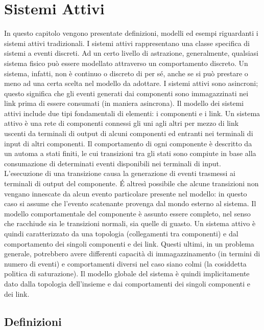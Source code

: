\chapter{Sistemi Attivi}
In questo capitolo vengono presentate definizioni, modelli ed esempi riguardanti i sistemi attivi tradizionali.
I sistemi attivi rappresentano una classe specifica di sistemi a eventi discreti. Ad un certo livello di astrazione, generalmente, qualsiasi sistema fisico può essere modellato attraverso un comportamento discreto. Un sistema, infatti, non è continuo o discreto di per sé, anche se si può prestare o meno ad una certa scelta nel modello da adottare.
I sistemi attivi sono asincroni; questo significa che gli eventi generati dai componenti sono immagazzinati nei link prima di essere consumati (in maniera asincrona).
Il modello dei sistemi attivi include due tipi fondamentali di elementi: i componenti e i link. Un sistema attivo è una rete di componenti connessi gli uni agli altri per mezzo di link uscenti da terminali di output di alcuni componenti ed entranti nei terminali di input di altri componenti. Il comportamento di ogni componente è descritto da un automa a stati finiti, le cui transizioni tra gli stati sono compiute in base alla consumazione di determinati eventi disponibili nei terminali di input. L'esecuzione di una transizione causa la generazione di eventi trasmessi ai terminali di output del componente. \'E altresì possibile che alcune transizioni non vengano innescate da alcun evento particolare presente nel modello: in questo caso si assume che l'evento scatenante provenga dal mondo esterno al sistema. Il modello comportamentale del componente è assunto essere completo, nel senso che racchiude sia le transizioni normali, sia quelle di guasto.
Un sistema attivo è quindi caratterizzato da una topologia (collegamenti tra componenti) e dal comportamento dei singoli componenti e dei link. Questi ultimi, in un problema generale, potrebbero avere differenti capacità di immagazzinamento (in termini di numero di eventi) e comportamenti diversi nel caso siano colmi (la cosiddetta politica di saturazione).
Il modello globale del sistema è quindi implicitamente dato dalla topologia dell'insieme e dai comportamenti dei singoli componenti e dei link. 

\newpage
\section{Definizioni}
